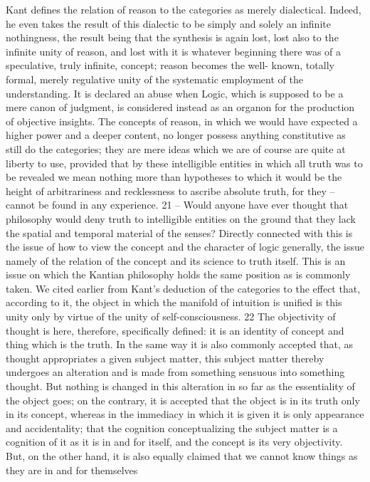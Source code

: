 Kant defines the relation of reason to the categories as merely dialectical.
Indeed, he even takes the result of this dialectic to be simply and solely
an infinite nothingness, the result being that the synthesis is again lost, lost
also to the infinite unity of reason, and lost with it is whatever beginning
there was of a speculative, truly infinite, concept; reason becomes the well-
known, totally formal, merely regulative unity of the systematic employment
of the understanding. It is declared an abuse when Logic, which is supposed
to be a mere canon of judgment, is considered instead as an organon for
the production of objective insights. The concepts of reason, in which
we would have expected a higher power and a deeper content, no longer
possess anything constitutive as still do the categories; they are mere ideas
which we are of course are quite at liberty to use, provided that by these
intelligible entities in which all truth was to be revealed we mean nothing
more than hypotheses to which it would be the height of arbitrariness and
recklessness to ascribe absolute truth, for they – cannot be found in any
experience. 21 – Would anyone have ever thought that philosophy would
deny truth to intelligible entities on the ground that they lack the spatial
and temporal material of the senses?
Directly connected with this is the issue of how to view the concept
and the character of logic generally, the issue namely of the relation of
the concept and its science to truth itself. This is an issue on which the
Kantian philosophy holds the same position as is commonly taken. We
cited earlier from Kant’s deduction of the categories to the effect that,
according to it, the object in which the manifold of intuition is unified is
this unity only by virtue of the unity of self-consciousness. 22 The objectivity of
thought is here, therefore, specifically defined: it is an identity of concept
and thing which is the truth. In the same way it is also commonly accepted
that, as thought appropriates a given subject matter, this subject matter
thereby undergoes an alteration and is made from something sensuous
into something thought. But nothing is changed in this alteration in so
far as the essentiality of the object goes; on the contrary, it is accepted that
the object is in its truth only in its concept, whereas in the immediacy in
which it is given it is only appearance and accidentality; that the cognition
conceptualizing the subject matter is a cognition of it as it is in and for itself,
and the concept is its very objectivity. But, on the other hand, it is also
equally claimed that we cannot know things as they are in and for themselves
